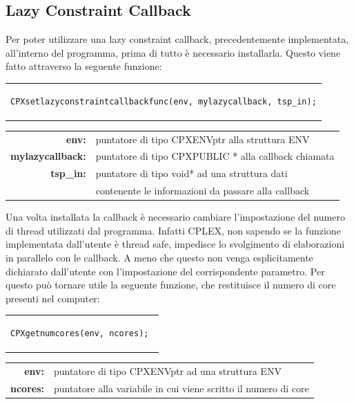 \subsection{Lazy Constraint Callback}
Per poter utilizzare una lazy constraint callback, precedentemente implementata, all'interno del programma, prima di tutto è necessario installarla. Questo viene fatto attraverso la seguente funzione:
\begin{center}
\begin{tabular}{c}
\begin{lstlisting}[linewidth=380pt, basicstyle=\footnotesize\sffamily,]     
CPXsetlazyconstraintcallbackfunc(env, mylazycallback, tsp_in);
\end{lstlisting}
\end{tabular}
\end{center}
\begin{table}[h]
\centering
\begin{tabular}{rl}
\textbf{env:} & {puntatore di tipo CPXENVptr alla struttura ENV}\\
\textbf{mylazycallback:} & {puntatore di tipo CPXPUBLIC * alla callback chiamata}\\
\textbf{tsp\_in:} & {puntatore di tipo void* ad una struttura dati }\\
& {contenente le informazioni da passare alla callback}\\
\end{tabular}
\end{table}
Una volta installata la callback è necessario cambiare l'impostazione del numero di thread utilizzati dal programma. Infatti CPLEX, non sapendo se la funzione implementata dall'utente è thread safe, impedisce lo svolgimento di elaborazioni in parallelo con le callback. A meno che questo non venga esplicitamente dichiarato dall'utente con l'impostazione del corrispondente parametro.
Per questo può tornare utile la seguente funzione, che restituisce il numero di core presenti nel computer:\\
\begin{center}
\begin{tabular}{c}
\begin{lstlisting}[linewidth=170pt, basicstyle=\footnotesize\sffamily,]
CPXgetnumcores(env, ncores); 
\end{lstlisting}
\end{tabular}
\end{center}
\vspace{2cm}
\begin{table}[h]
\centering
\begin{tabular}{rl}
\textbf{env:} & {puntatore di tipo CPXENVptr ad una struttura ENV}\\
\textbf{ncores:} & {puntatore alla variabile in cui viene scritto il numero di core}\\            
\end{tabular}
\end{table} 
